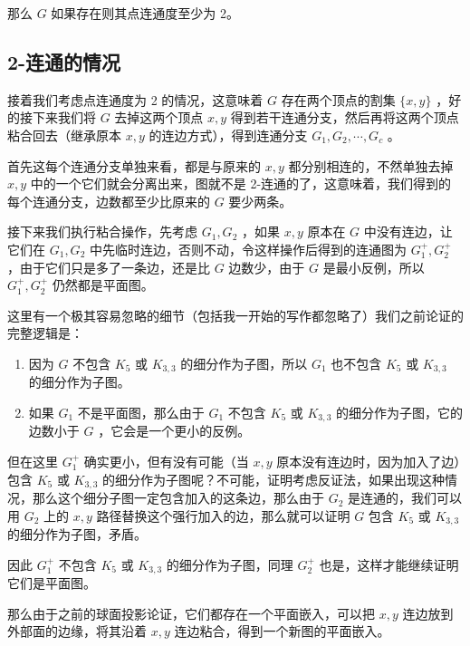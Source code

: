 \documentclass[11pt, a4paper]{ctexart}
\begin{document}
那么 $G$ 如果存在则其点连通度至少为 2。

\subsection{2-连通的情况}
接着我们考虑点连通度为 2 的情况，这意味着 $G$ 存在两个顶点的割集 $\{x,y\}$ ，好的接下来我们将 $G$ 去掉这两个顶点 $x,y$ 得到若干连通分支，然后再将这两个顶点粘合回去（继承原本 $x,y$ 的连边方式），得到连通分支 $G_1,G_2,\cdots,G_c$ 。

首先这每个连通分支单独来看，都是与原来的 $x,y$ 都分别相连的，不然单独去掉 $x,y$ 中的一个它们就会分离出来，图就不是 2-连通的了，这意味着，我们得到的每个连通分支，边数都至少比原来的 $G$ 要少两条。

接下来我们执行粘合操作，先考虑 $G_1,G_2$ ，如果 $x,y$ 原本在 $G$ 中没有连边，让它们在 $G_1,G_2$ 中先临时连边，否则不动，令这样操作后得到的连通图为 $G_1^+,G_2^+$ ，由于它们只是多了一条边，还是比 $G$ 边数少，由于 $G$ 是最小反例，所以 $G_1^+,G_2^+$ 仍然都是平面图。

这里有一个极其容易忽略的细节（包括我一开始的写作都忽略了）我们之前论证的完整逻辑是：
\begin{enumerate}
    \item 因为 $G$ 不包含 $K_5$ 或 $K_{3,3}$ 的细分作为子图，所以 $G_1$ 也不包含 $K_5$ 或 $K_{3,3}$ 的细分作为子图。
    \item 如果 $G_1$ 不是平面图，那么由于 $G_1$ 不包含 $K_5$ 或 $K_{3,3}$ 的细分作为子图，它的边数小于 $G$ ，它会是一个更小的反例。
\end{enumerate}

但在这里 $G_1^+$ 确实更小，但有没有可能（当 $x,y$ 原本没有连边时，因为加入了边）包含 $K_5$ 或 $K_{3,3}$ 的细分作为子图呢？不可能，证明考虑反证法，如果出现这种情况，那么这个细分子图一定包含加入的这条边，那么由于 $G_2$ 是连通的，我们可以用 $G_2$ 上的 $x,y$ 路径替换这个强行加入的边，那么就可以证明 $G$ 包含 $K_5$ 或 $K_{3,3}$ 的细分作为子图，矛盾。

因此 $G_1^+$ 不包含 $K_5$ 或 $K_{3,3}$ 的细分作为子图，同理 $G_2^+$ 也是，这样才能继续证明它们是平面图。

那么由于之前的球面投影论证，它们都存在一个平面嵌入，可以把 $x,y$ 连边放到外部面的边缘，将其沿着 $x,y$ 连边粘合，得到一个新图的平面嵌入。
\end{document}
